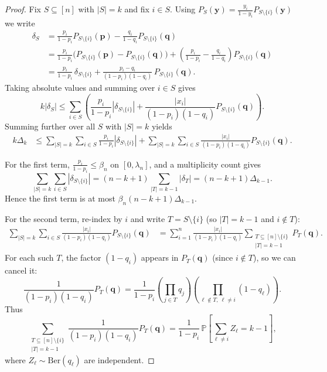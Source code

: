 \documentclass[11pt]{amsart}
\numberwithin{equation}{section}
\theoremstyle{definition}
\newcommand{\abs}[1]{\left|#1\right|}
\newcommand{\vct}[1]{\mathbf{#1}}
\newcommand{\pvec}{\vct{p}}
\newcommand{\qvec}{\vct{q}}
\newcommand{\yvec}{\vct{y}}
\newcommand{\lam}{\lambda}
\begin{document}
\begin{proof}
Fix $S\subseteq[n]$ with $|S|=k$ and fix $i\in S$.
Using $P_S(\yvec)=\frac{y_i}{1-y_i}P_{S\setminus\{i\}}(\yvec)$ we write
\begin{align*}
\delta_S
&=
\frac{p_i}{1-p_i}P_{S\setminus\{i\}}(\pvec)-\frac{q_i}{1-q_i}P_{S\setminus\{i\}}(\qvec)\\
&=
\frac{p_i}{1-p_i}\big(P_{S\setminus\{i\}}(\pvec)-P_{S\setminus\{i\}}(\qvec)\big)
+\left(\frac{p_i}{1-p_i}-\frac{q_i}{1-q_i}\right)P_{S\setminus\{i\}}(\qvec)\\
&=\frac{p_i}{1-p_i}\,\delta_{S\setminus\{i\}}+\frac{p_i-q_i}{(1-p_i)(1-q_i)}\,P_{S\setminus\{i\}}(\qvec).
\end{align*}
Taking absolute values and summing over $i\in S$ gives
\[
k\abs{\delta_S}
\le
\sum_{i\in S}\left(\frac{p_i}{1-p_i}\abs{\delta_{S\setminus\{i\}}}
+\frac{\abs{x_i}}{(1-p_i)(1-q_i)}P_{S\setminus\{i\}}(\qvec)\right).
\]
Summing further over all $S$ with $|S|=k$ yields
\begin{align*}
k\Delta_k
&\le
\sum_{|S|=k}\sum_{i\in S}\frac{p_i}{1-p_i}\abs{\delta_{S\setminus\{i\}}}
+\sum_{|S|=k}\sum_{i\in S}\frac{\abs{x_i}}{(1-p_i)(1-q_i)}P_{S\setminus\{i\}}(\qvec).
\end{align*}

For the first term, $\frac{p_i}{1-p_i}\le \beta_n$ on $[0,\lam_n]$, and a multiplicity count gives
\[
\sum_{|S|=k}\sum_{i\in S}\abs{\delta_{S\setminus\{i\}}}
=(n-k+1)\sum_{|T|=k-1}\abs{\delta_T}
=(n-k+1)\Delta_{k-1}.
\]
Hence the first term is at most $\beta_n(n-k+1)\Delta_{k-1}$.

For the second term, re-index by $i$ and write $T=S\setminus\{i\}$ (so $|T|=k-1$ and $i\notin T$):
\begin{align*}
\sum_{|S|=k}\sum_{i\in S}\frac{\abs{x_i}}{(1-p_i)(1-q_i)}P_{S\setminus\{i\}}(\qvec)
&=
\sum_{i=1}^n\frac{\abs{x_i}}{(1-p_i)(1-q_i)}\sum_{\substack{T\subseteq[n]\setminus\{i\}\\ |T|=k-1}} P_T(\qvec).
\end{align*}
For each such $T$, the factor $(1-q_i)$ appears in $P_T(\qvec)$ (since $i\notin T$), so we can cancel it:
\[
\frac{1}{(1-p_i)(1-q_i)}P_T(\qvec)
=\frac{1}{1-p_i}\left(\prod_{j\in T}q_j\right)\left(\prod_{\ell\notin T,\ \ell\neq i}(1-q_\ell)\right).
\]
Thus
\[
\sum_{\substack{T\subseteq[n]\setminus\{i\}\\ |T|=k-1}}
\frac{1}{(1-p_i)(1-q_i)}P_T(\qvec)
=\frac{1}{1-p_i}\,\mathbb{P}\!\left[\sum_{\ell\neq i} Z_\ell = k-1\right],
\]
where $Z_\ell\sim\mathrm{Ber}(q_\ell)$ are independent.


\end{proof}
\end{document}
